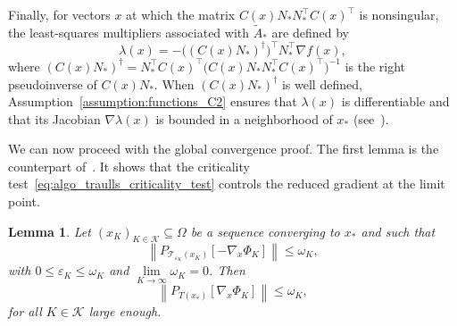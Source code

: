 \documentclass{article}
\numberwithin{equation}{section}
\newcommand{\calK}{{\mathcal{K}}}
\newcommand{\calT}{{\mathcal{T}}}
\newcommand{\proj}[2]{P_{#1} \left[ {#2} \right]} %
\theoremstyle{plain}
\newtheorem{lemma}[theorem]{Lemma}
\begin{document}
Finally, for vectors $x$ at which the matrix $C(x)N_* N_*^\top C(x)^\top$ is nonsingular, the least-squares multipliers associated with $\tilde A_*$ are defined by
\begin{equation}\label{eq:least-squares_mult}
	\lambda(x) = -\big((C(x)N_*)^\dagger\big)^\top N_*^\top\nabla f(x),
\end{equation}
where $(C(x)N_*)^\dagger = N_*^\top C(x)^\top\big(C(x)N_* N_*^\top C(x)^\top\big)^{-1}$ is the right pseudoinverse of $C(x)N_*$. When $(C(x)N_*)^\dagger $ is well defined, Assumption~\ref{assumption:functions_C2} ensures that $\lambda(x)$ is differentiable and that its Jacobian $\nabla\lambda(x)$ is bounded in a neighborhood of $x_*$ (see~\cite[Lemma~2.1]{conn-etal:1996b}).

We can now proceed with the global convergence proof. The first lemma is the counterpart of~\cite[Lemma~4.1]{conn-etal:1996b}. It shows that the criticality test~\eqref{eq:algo_traulls_criticality_test} controls the reduced gradient at the limit point.
\begin{lemma}\label{lemma:bound_proj_algrad_sol_nullspace}
	Let $\left(x_K\right)_{K\in \calK} \subseteq \Omega$ be a sequence converging to $x_*$ and such that
	\[\left\| \proj{\calT_{\varepsilon_K}(x_K)}{-\nabla_x \Phi_K} \right\| \le \omega_K,\]
	with $0 \le \varepsilon_K \le \omega_K$ and $\lim\limits_{K\to \infty} \omega_K = 0$. Then
	\begin{equation*}
		\left\| \proj{T(x_*)}{\nabla_x \Phi_K} \right\| \le  \omega_K,
	\end{equation*}
	for all $K\in \calK$ large enough.
\end{lemma}
\end{document}
